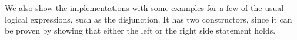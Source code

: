 \setlength{\savedcolumnsep}{\columnsep}
\setlength{\columnsep}{-2.5cm}
\begin{multicols}{2}[]
    \begin{code}
        \>[0]\AgdaSpace{}%
        \AgdaSymbol{:}\AgdaSpace{}%
        \AgdaSpace{}%
        \<%
        \\
        \>[0]\AgdaSpace{}%
        \AgdaSymbol{=}\AgdaSpace{}%
        \<%
        \\
        \\[\AgdaEmptyExtraSkip]%
        \>[0]\AgdaSpace{}%
        \AgdaSymbol{:}\AgdaSpace{}%
        \AgdaSpace{}%
        \<%
        \\
        \>[0]\AgdaSpace{}%
        \AgdaSymbol{=}\AgdaSpace{}%
        \AgdaSpace{}%
        \<%
    \end{code}
    \begin{code}
        \\[\AgdaEmptyExtraSkip]%
        \\[\AgdaEmptyExtraSkip]%
        \>[0]\AgdaSpace{}%
        \AgdaSymbol{:}\AgdaSpace{}%
        \AgdaSpace{}%
        \<%
        \\
        \>[0]\AgdaSpace{}%
        \AgdaSymbol{=}\AgdaSpace{}%
        \AgdaSpace{}%
        \AgdaSymbol{(}\AgdaSpace{}%
        \AgdaSymbol{(}\AgdaSymbol{))}\<%
    \end{code}
\end{multicols}
\setlength{\columnsep}{\savedcolumnsep}

We also show the implementations with some examples for a few of the usual logical expressions, such as the disjunction. It has two constructors, since it can be proven by showing that either the left or the right side statement holds.

